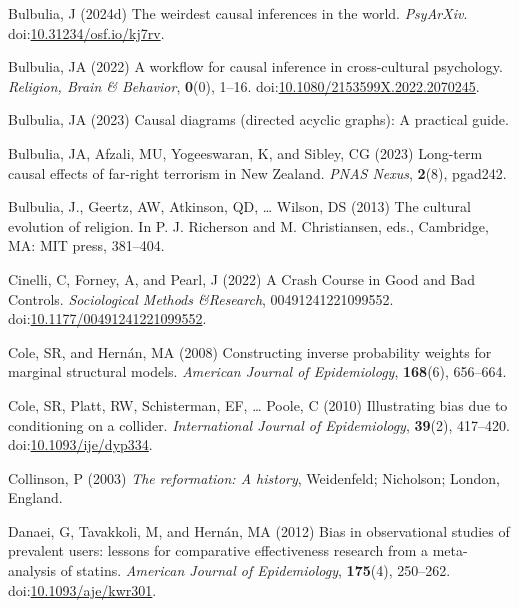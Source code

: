\documentclass[
  single column]{article}
\newlength{\cslhangindent}
\newenvironment{CSLReferences}[2] %
 {\begin{list}{}{%
  \setlength{\itemindent}{0pt}
  \setlength{\leftmargin}{0pt}
  \setlength{\parsep}{0pt}
  \ifodd #1
   \setlength{\leftmargin}{\cslhangindent}
   \setlength{\itemindent}{-1\cslhangindent}
  \fi
  \setlength{\itemsep}{#2\baselineskip}}}
 {\end{list}}
\begin{document}
\begin{CSLReferences}{1}{0}
Bulbulia, J (2024d) The weirdest causal inferences in the world.
\emph{PsyArXiv}.
doi:\href{https://doi.org/10.31234/osf.io/kj7rv}{10.31234/osf.io/kj7rv}.

Bulbulia, JA (2022) A workflow for causal inference in cross-cultural
psychology. \emph{Religion, Brain \& Behavior}, \textbf{0}(0), 1--16.
doi:\href{https://doi.org/10.1080/2153599X.2022.2070245}{10.1080/2153599X.2022.2070245}.

Bulbulia, JA (2023) Causal diagrams (directed acyclic graphs): A
practical guide.

Bulbulia, JA, Afzali, MU, Yogeeswaran, K, and Sibley, CG (2023)
Long-term causal effects of far-right terrorism in {N}ew {Z}ealand.
\emph{PNAS Nexus}, \textbf{2}(8), pgad242.

Bulbulia, J., Geertz, AW, Atkinson, QD, \ldots{} Wilson, DS (2013) The
cultural evolution of religion. In P. J. Richerson and M. Christiansen,
eds., Cambridge, MA: MIT press, 381--404.

Cinelli, C, Forney, A, and Pearl, J (2022) A Crash Course in Good and
Bad Controls. \emph{Sociological Methods \&Research}, 00491241221099552.
doi:\href{https://doi.org/10.1177/00491241221099552}{10.1177/00491241221099552}.

Cole, SR, and Hernán, MA (2008) Constructing inverse probability weights
for marginal structural models. \emph{American Journal of Epidemiology},
\textbf{168}(6), 656--664.

Cole, SR, Platt, RW, Schisterman, EF, \ldots{} Poole, C (2010)
Illustrating bias due to conditioning on a collider. \emph{International
Journal of Epidemiology}, \textbf{39}(2), 417--420.
doi:\href{https://doi.org/10.1093/ije/dyp334}{10.1093/ije/dyp334}.

Collinson, P (2003) \emph{The reformation: A history}, Weidenfeld;
Nicholson; London, England.

Danaei, G, Tavakkoli, M, and Hernán, MA (2012) Bias in observational
studies of prevalent users: lessons for comparative effectiveness
research from a meta-analysis of statins. \emph{American Journal of
Epidemiology}, \textbf{175}(4), 250--262.
doi:\href{https://doi.org/10.1093/aje/kwr301}{10.1093/aje/kwr301}.


\end{CSLReferences}
\end{document}
